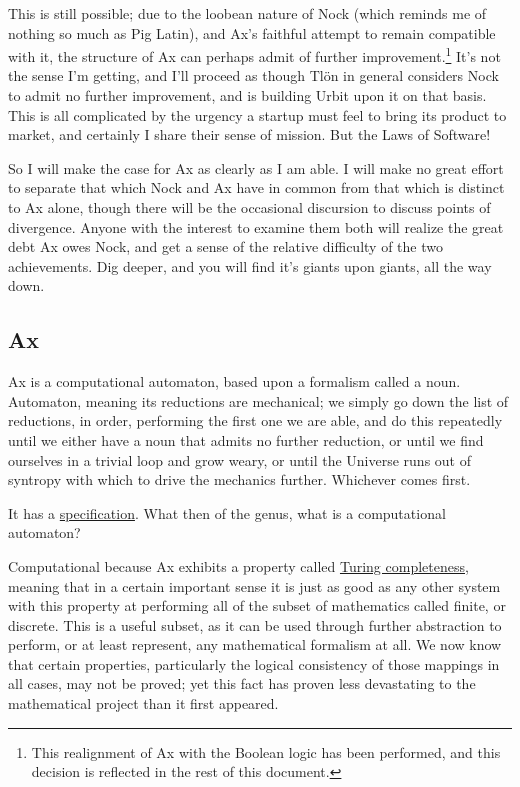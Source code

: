 \documentclass[twoside]{article}
\begin{document}
This is still possible; due to the loobean nature of Nock (which reminds me of nothing so much as Pig Latin), and Ax's faithful attempt to remain compatible with it, the structure of Ax can perhaps admit of further improvement.\footnote{This realignment of Ax with the Boolean logic has been performed, and this decision is reflected in the rest of this document.} It's not the sense I'm getting, and I'll proceed as though Tlön in general considers Nock to admit no further improvement, and is building Urbit upon it on that basis. This is all complicated by the urgency a startup must feel to bring its product to market, and certainly I share their sense of mission. But the Laws of Software!

So I will make the case for Ax as clearly as I am able. I will make no great effort to separate that which Nock and Ax have in common from that which is distinct to Ax alone, though there will be the occasional discursion to discuss points of divergence. Anyone with the interest to examine them both will realize the great debt Ax owes Nock, and get a sense of the relative difficulty of the two achievements. Dig deeper, and you will find it's giants upon giants, all the way down.

\subsection{Ax}

Ax is a computational automaton, based upon a formalism called a noun. Automaton, meaning its reductions are mechanical; we simply go down the list of reductions, in order, performing the first one we are able, and do this repeatedly until we either have a noun that admits no further reduction, or until we find ourselves in a trivial loop and grow weary, or until the Universe runs out of syntropy with which to drive the mechanics further. Whichever comes first.

It has a \href{https://github.com/mnemnion/ax/blob/master/ax%20spec.md}{specification}. What then of the genus, what is a computational automaton?

Computational because Ax exhibits a property called \href{https://en.wikipedia.org/wiki/Turing_completeness}{Turing completeness}, meaning that in a certain important sense it is just as good as any other system with this property at performing all of the subset of mathematics called finite, or discrete. This is a useful subset, as it can be used through further abstraction to perform, or at least represent, any mathematical formalism at all. We now know that certain properties, particularly the logical consistency of those mappings in all cases, may not be proved; yet this fact has proven less devastating to the mathematical project than it first appeared.
\end{document}
